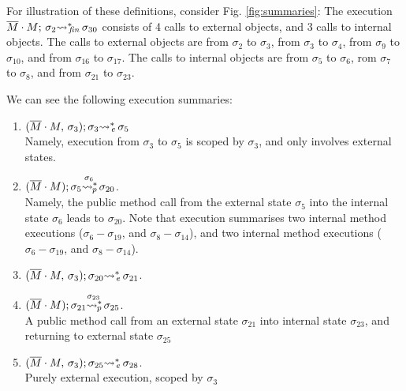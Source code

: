 For illustration of these definitions, consider  Fig. \ref{fig:summaries}: 
The  execution $ \leadstoBoundedStarFin {\Mtwo\cdot M}    {\sigma_2}  {\sigma_{30}}$ consists of 4 calls to external objects,
and 3 calls to internal objects.
The calls to external objects are from $\sigma_2$ to $\sigma_3$,  from $\sigma_3$ to $\sigma_4$, from $\sigma_9$ to $\sigma_{10}$, 
and  from $\sigma_{16}$ to $\sigma_{17}$.
 The calls to internal objects are from $\sigma_5$ to $\sigma_6$, rom $\sigma_7$ to $\sigma_8$, and from $\sigma_{21}$ to $\sigma_{23}$. 
 
We can see the following execution summaries:
\begin{enumerate}
\item
${\leadstoBoundedThreeStarExt {\Mtwo\cdot M} {\sigma_3}  {\sigma_3}  {\sigma_5}}$\\
Namely,  execution from $\sigma_3$ to $\sigma_5$ is scoped by $\sigma_3$, and  only involves external states.  
\item
${\WithPub {\Mtwo\cdot M}    {\sigma_5}  {\sigma_{20}} {\sigma_{6}}}$.\\
Namely, the public method call from the external state $\sigma_5$ into the internal state $\sigma_6$ leads to $\sigma_{20}$. 
Note that execution summarises two  internal method executions ($\sigma_{6}-\sigma_{19}$, and $\sigma_8-\sigma_{14}$),
and two internal method executions ($\sigma_{6}-\sigma_{19}$, and $\sigma_8-\sigma_{14}$).
\item
 ${\leadstoBoundedThreeStarExt {\Mtwo\cdot M} {\sigma_3}  {\sigma_{20}}  {\sigma_{21}}}$.
 \item
${\WithPub {\Mtwo\cdot M}    {\sigma_{21}}  {\sigma_{25}} {\sigma_{23}}}$.\\
A  public method call from an external state ${\sigma_{21}}$ into internal state $\sigma_{23}$, and returning to external state $\sigma_25$
 \item
  ${\leadstoBoundedThreeStarExt {\Mtwo\cdot M} {\sigma_3}  {\sigma_{25}}  {\sigma_{28}}}$.
  \\
  Purely external execution, scoped by ${\sigma_3}$
\end{enumerate}




